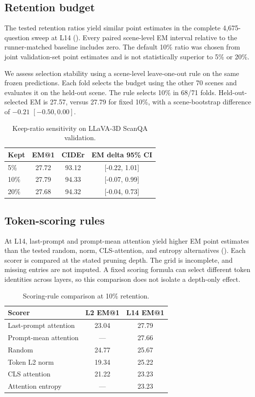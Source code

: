\subsection{Retention budget}
\label{sec:supp_keep_ratio}

The tested retention ratios yield similar point estimates in the complete 4,675-question sweep at L14 (). Every paired scene-level EM interval relative to the runner-matched baseline includes zero. The default 10\% ratio was chosen from joint validation-set point estimates and is not statistically superior to 5\% or 20\%.

We assess selection stability using a scene-level leave-one-out rule on the same frozen predictions. Each fold selects the budget using the other 70 scenes and evaluates it on the held-out scene. The rule selects 10\% in 68/71 folds. Held-out-selected EM is 27.57, versus 27.79 for fixed 10\%, with a scene-bootstrap difference of $-0.21$ $[-0.50,0.00]$.

\begin{table}[t]
\centering
\caption{Keep-ratio sensitivity on LLaVA-3D ScanQA validation.}
\label{tab:supp_ratio}
\begin{tabular}{lccc}
\toprule
Kept & EM@1 & CIDEr & EM delta 95\% CI \\
\midrule
5\% & 27.72 & 93.12 & [-0.22, 1.01] \\
10\% & 27.79 & 94.33 & [-0.07, 0.99] \\
20\% & 27.68 & 94.32 & [-0.04, 0.73] \\
\bottomrule
\end{tabular}
\end{table}

\subsection{Token-scoring rules}
\label{sec:supp_scorers}

At L14, last-prompt and prompt-mean attention yield higher EM point estimates than the tested random, norm, CLS-attention, and entropy alternatives (). Each scorer is compared at the stated pruning depth. The grid is incomplete, and missing entries are not imputed. A fixed scoring formula can select different token identities across layers, so this comparison does not isolate a depth-only effect.

\begin{table}[t]
\centering
\caption{Scoring-rule comparison at 10\% retention.}
\label{tab:supp_scorer}
\begin{tabular}{lcc}
\toprule
Scorer & L2 EM@1 & L14 EM@1 \\
\midrule
Last-prompt attention & 23.04 & 27.79 \\
Prompt-mean attention & --- & 27.66 \\
Random & 24.77 & 25.67 \\
Token L2 norm & 19.34 & 25.22 \\
CLS attention & 21.22 & 23.23 \\
Attention entropy & --- & 23.23 \\
\bottomrule
\end{tabular}
\end{table}

